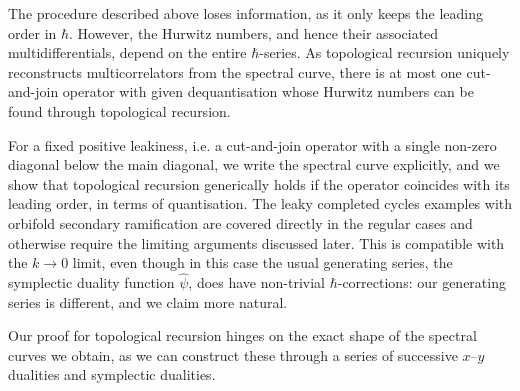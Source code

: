 \documentclass[10pt,a4paper,oneside,no-math,reqno]{amsart}%
\theoremstyle{plain}
\theoremstyle{definition}
\theoremstyle{remark}
\numberwithin{equation}{section}
\newcommand{\mb}[1]{\mathbb{#1}}
\newcommand{\1}{\mathds{1}}
\renewcommand{\P}{\mb{P}}
\newcommand{\<}{\langle}
\renewcommand{\>}{\rangle}
\begin{document}
The procedure described above loses information, as it only keeps the leading order in $\hbar$. However, the Hurwitz numbers, and hence their associated multidifferentials, depend on the entire $ \hbar$-series. As topological recursion uniquely reconstructs multicorrelators from the spectral curve, there is at most one cut-and-join operator with given dequantisation whose Hurwitz numbers can be found through topological recursion.

For a fixed positive leakiness, i.e. a cut-and-join operator with a single non-zero diagonal below the main diagonal, we write the spectral curve explicitly, and we show that topological recursion generically holds if the operator coincides with its leading order, in terms of quantisation. The leaky completed cycles examples with orbifold secondary ramification are covered directly in the regular cases and otherwise require the limiting arguments discussed later. This is compatible with the $ k \to 0$ limit, even though in this case the usual generating series, the symplectic duality function $ \hat{\psi}$, does have non-trivial $\hbar$-corrections: our generating series is different, and we claim more natural.\par
Our proof for topological recursion hinges on the exact shape of the spectral curves we obtain, as we can construct these through a series of successive $x$--$y$ dualities and symplectic dualities.

\end{document}
